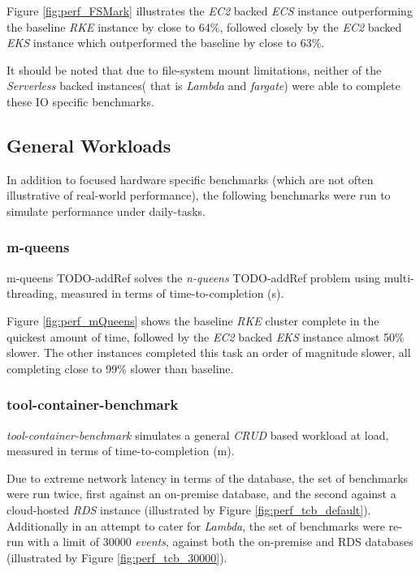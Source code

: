 Figure \ref{fig:perf_FSMark} illustrates the \textit{EC2} backed \textit{ECS} instance outperforming the baseline \textit{RKE} instance by close to 64\%,
followed closely by the \textit{EC2} backed \textit{EKS} instance which outperformed the baseline by close to 63\%.

\noindent \newline It should be noted that due to file-system mount limitations, neither of the \textit{Serverless} backed instances( that is \textit{Lambda} and \textit{fargate}) were able to complete these I\/O specific benchmarks.

\subsection{General Workloads}
In addition to focused hardware specific benchmarks (which are not often illustrative of real-world performance),
the following benchmarks were run to simulate performance under daily-tasks.

\subsubsection{m-queens}
m-queens TODO-addRef solves the \emph{n-queens} TODO-addRef problem using multi-threading, measured in terms of time-to-completion (s).

Figure \ref{fig:perf_mQueens} shows the baseline \textit{RKE} cluster complete in the quickest amount of time,
followed by the \textit{EC2} backed \textit{EKS} instance almost 50\% slower.
The other instances completed this task an order of magnitude slower, all completing close to 99\% slower than baseline.

\subsubsection{tool-container-benchmark}
\emph{tool-container-benchmark} simulates a general \textit{CRUD} based workload at load, measured in terms of time-to-completion (m).

Due to extreme network latency in terms of the database, the set of benchmarks were run twice,
first against an on-premise database, and the second against a cloud-hosted \textit{RDS} instance (illustrated by Figure \ref{fig:perf_tcb_default}).
Additionally in an attempt to cater for \textit{Lambda}, the set of benchmarks were re-run with a limit of 30000 \emph{events},
against both the on-premise and RDS databases
(illustrated by Figure \ref{fig:perf_tcb_30000}).

